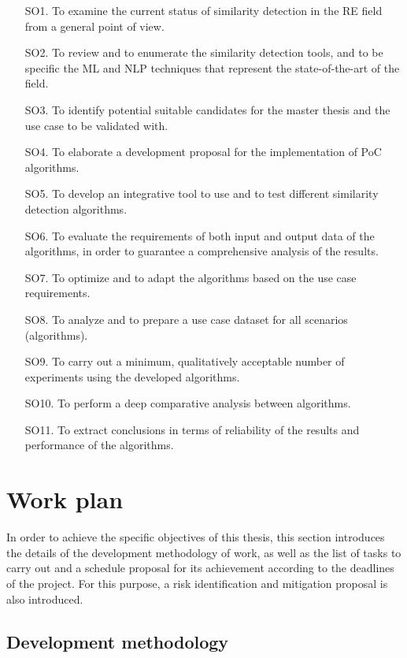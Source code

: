 \documentclass[a4paper]{article}
\begin{document}
\begin{enumerate}
\item[SO1.] To examine the current status of similarity detection in the RE field from a general point of view.
\item[SO2.] To review and to enumerate the similarity detection tools, and to be specific the ML and NLP techniques that represent the state-of-the-art of the field.
\item[SO3.] To identify potential suitable candidates for the master thesis and the use case to be validated with.
\item[SO4.] To elaborate a development proposal for the implementation of PoC algorithms.
\item[SO5.] To develop an integrative tool to use and to test different similarity detection algorithms.
\item[SO6.] To evaluate the requirements of both input and output data of the algorithms, in order to guarantee a comprehensive analysis of the results.
\item[SO7.] To optimize and to adapt the algorithms based on the use case requirements.
\item[SO8.] To analyze and to prepare a use case dataset for all scenarios (algorithms).
\item[SO9.] To carry out a minimum, qualitatively acceptable number of experiments using the developed algorithms.
\item[SO10.] To perform a deep comparative analysis between algorithms.
\item[SO11.] To extract conclusions in terms of reliability of the results and performance of the algorithms.
\end{enumerate}

\section{Work plan}

In order to achieve the specific objectives of this thesis, this section introduces the details of the development methodology of work, as well as the list of tasks to carry out and a schedule proposal for its achievement according to the deadlines of the project. For this purpose, a risk identification and mitigation proposal is also introduced.

\subsection{Development methodology}
\end{document}
